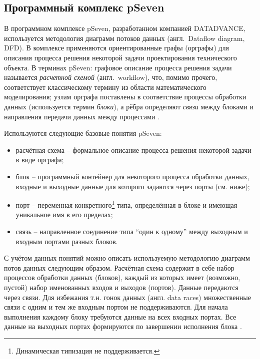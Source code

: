 \subsection{Программный комплекс pSeven}

В программном комплексе \textsf{pSeven}, разработанном компанией DATADVANCE, используется методология диаграмм потоков данных (англ.~Dataflow diagram, DFD). В комплексе применяются ориентированные графы (орграфы) для описания процесса решения некоторой задачи проектирования технического объекта. В терминах \textsf{pSeven}: графовое описание процесса решения задачи называется \textit{расчетной схемой} (англ.~workflow), что, помимо прочего, соответствует классическому термину из области математического моделирования; узлам орграфа поставлены в соответствие процессы обработки данных (используется термин \textit{блоки}), а рёбра определяют \textit{связи} между блоками и направления передачи данных между процессами \cite{Nazarenko2015}. 

Используются следующие базовые понятия \textsf{pSeven}:
\begin{itemize}
    \item \textsf{расчётная схема} -- формальное описание процесса решения некоторой задачи в виде орграфа;
    \item \textsf{блок} -- программный контейнер для некоторого процесса обработки данных, входные и выходные данные для которого задаются через порты (см. ниже);
    \item \textsf{порт} -- переменная конкретного\footnote{Динамическая типизация не поддерживается.} типа, определённая в блоке и имеющая уникальное имя в его пределах;
    \item \textsf{связь} -- направленное соединение типа ``один к одному'' между выходным и входным портами разных блоков.
\end{itemize}

С учётом данных понятий можно описать используемую методологию диаграмм потов данных следующим образом. Расчётная схема содержит в себе набор процессов обработки данных (блоков), каждый из которых имеет (возможно, пустой) набор именованных входов и выходов (портов). Данные передаются через связи. Для избежания т.н. гонок данных (англ. data races) множественные связи с одним и тем же входным портом не поддерживаются. Для начала выполнения каждому блоку требуются данные на всех входных портах. Все данные на выходных портах формируются по завершении исполнения блока \cite{Nazarenko2015}.

